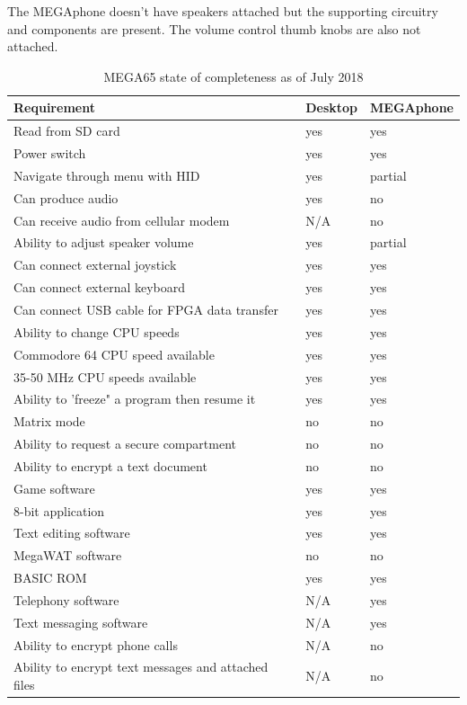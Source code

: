 The MEGAphone doesn't have speakers attached but the supporting circuitry and components are present. The volume control thumb knobs are also not attached. 

\begin{table}[h!]
  \begin{center}
    \caption{MEGA65 state of completeness as of July 2018}
    \label{tab:table1}
    \begin{tabular}{l|l|l} %
      \textbf{Requirement} & \textbf{Desktop} & \textbf{MEGAphone}\\
      \hline
      Read from SD card 									& yes		& yes \\
      Power switch											& yes 		& yes \\
      Navigate through menu with HID						& yes		& partial \\
      Can produce audio										& yes		& no \\
      Can receive audio from cellular modem					& N/A		& no 	\\
      Ability to adjust speaker volume						& yes		& partial \\
      Can connect external joystick							& yes 		& yes \\
      Can connect external keyboard							& yes		& yes \\
      Can connect USB cable for FPGA data transfer			& yes 		& yes \\
      Ability to change CPU speeds							& yes 		& yes \\ 
      Commodore 64 CPU speed available						& yes 		& yes \\
      35-50 MHz CPU speeds available						& yes 		& yes \\
      Ability to 'freeze" a program then resume it			& yes 		& yes \\
      Matrix mode											& no 		& no \\
      Ability to request a secure compartment				& no 		& no \\ 
      Ability to encrypt a text document					& no 		& no \\ 
      Game software											& yes 		& yes \\
      8-bit application										& yes 		& yes \\
      Text editing software									& yes 		& yes \\
      MegaWAT software										& no 		& no \\
      BASIC ROM												& yes 		& yes \\
      Telephony software  									& N/A		& yes \\
  	  Text messaging software								& N/A		& yes \\
  	  Ability to encrypt phone calls						& N/A		& no \\
  	  Ability to encrypt text messages and attached files	& N/A		& no \\
    \end{tabular}
  \end{center}
\end{table}
